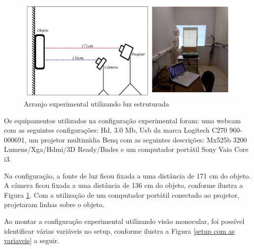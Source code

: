 \documentclass[a4paper, 12pt]{article}
\begin{document}
\begin{figure}[H]
	\centering
		\includegraphics[scale=0.5]{configuracao_sistema.png}
	\caption{Arranjo experimental utilizando luz estruturada}
	\label{arranjo experimetal}
\end{figure}


Os equipamentos utilizados na configuração experimental foram: uma webcam com as seguintes configurações: Hd, 3.0 Mb, Usb da marca Logitech C270 960-000691, um projetor multimídia Benq com as seguintes descrições: Mx525b 3200 Lumens/Xga/Hdmi/3D Ready/Bndes e um computador portátil Sony Vaio Core i3. 

Na configuração, a fonte de luz ficou fixada a uma distância de 171 cm do objeto. A câmera ficou fixada a uma distância de 136 cm do objeto, conforme ilustra a Figura \ref{arranjo experimetal}.  Com a utilização de um computador portátil conectado ao projetor, projetaram linhas sobre o objeto.

Ao montar a configuração experimental utilizando visão monocular, foi possível identificar várias variáveis no setup, conforme ilustra a Figura \ref{setup com as variaveis} a seguir.
\end{document}
